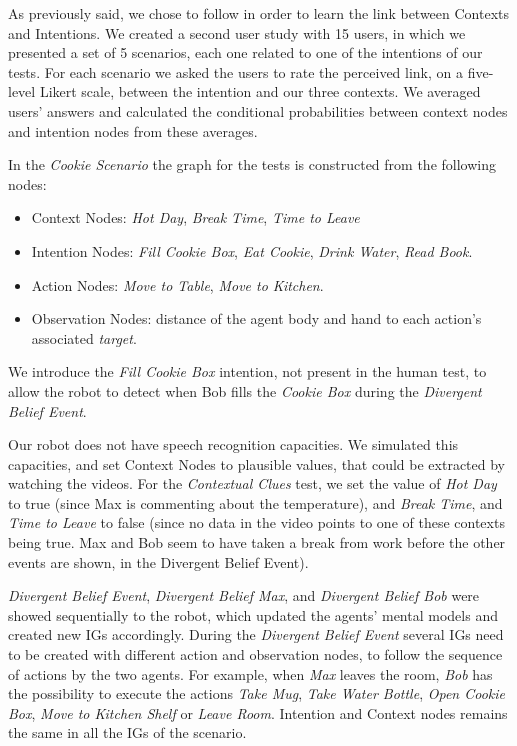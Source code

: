 As previously said, we chose to follow \cite{Liu2014} in order to learn the link between Contexts and Intentions. We created a second user study with 15 users, in which we presented a set of 5 scenarios, each one related to one of the intentions of our tests. For each scenario we asked the users to rate the perceived link, on a five-level Likert scale, between the intention and our three contexts. We averaged users' answers and calculated the conditional probabilities between context nodes and intention nodes from these averages.


In the \textit{Cookie Scenario} the graph for the tests is constructed from the following nodes:
\begin{itemize}
\item Context Nodes: \textit{Hot Day}, \textit{Break Time}, \textit{Time to Leave}
\item Intention Nodes: \textit{Fill Cookie Box}, \textit{Eat Cookie}, \textit{Drink Water}, \textit{Read Book}.
\item Action Nodes: \textit{Move to Table}, \textit{Move to Kitchen}.
\item Observation Nodes: distance of the agent body and hand to each action's associated \textit{target}.
\end{itemize}

We introduce the \textit{Fill Cookie Box} intention, not present in the human test, to allow the robot to detect when Bob fills the \textit{Cookie Box} during the \textit{Divergent Belief Event}.

Our robot does not have speech recognition capacities. We simulated this capacities, and set Context Nodes to plausible values, that could be extracted by watching the videos. For the \textit{Contextual Clues} test, we set the value of \textit{Hot Day} to true (since Max is commenting about the temperature), and \textit{Break Time}, and \textit{Time to Leave} to false (since no data in the video points to one of these contexts being true. Max and Bob seem to have taken a break from work before the other events are shown, in the Divergent Belief Event).

\textit{Divergent Belief Event}, \textit{Divergent Belief Max}, and \textit{Divergent Belief Bob} were showed sequentially to the robot, which updated the agents' mental models and created new IGs accordingly. During the \textit{Divergent Belief Event} several IGs need to be created with different action and observation nodes, to follow the sequence of actions by the two agents. For example, when \textit{Max} leaves the room, \textit{Bob} has the possibility to execute the actions \textit{Take Mug}, \textit{Take Water Bottle}, \textit{Open Cookie Box}, \textit{Move to Kitchen Shelf} or \textit{Leave Room}. Intention and Context nodes remains the same in all the IGs of the scenario.


